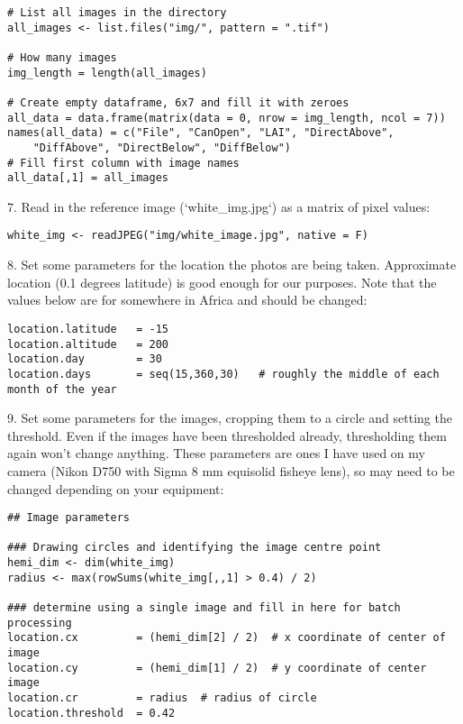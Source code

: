 \documentclass{article}
\begin{document}
\begin{lstlisting}
# List all images in the directory
all_images <- list.files("img/", pattern = ".tif")

# How many images
img_length = length(all_images)

# Create empty dataframe, 6x7 and fill it with zeroes
all_data = data.frame(matrix(data = 0, nrow = img_length, ncol = 7))
names(all_data) = c("File", "CanOpen", "LAI", "DirectAbove", 
	"DiffAbove", "DirectBelow", "DiffBelow")
# Fill first column with image names
all_data[,1] = all_images
\end{lstlisting}

7. Read in the reference image (`white\_img.jpg`) as a matrix of pixel values:

\begin{lstlisting}
white_img <- readJPEG("img/white_image.jpg", native = F)
\end{lstlisting}

8. Set some parameters for the location the photos are being taken. Approximate location (0.1 degrees latitude) is good enough for our purposes. Note that the values below are for somewhere in Africa and should be changed:

\begin{lstlisting}
location.latitude   = -15
location.altitude   = 200
location.day        = 30
location.days       = seq(15,360,30)   # roughly the middle of each month of the year 
\end{lstlisting}

9. Set some parameters for the images, cropping them to a circle and setting the threshold. Even if the images have been thresholded already, thresholding them again won't change anything. These parameters are ones I have used on my camera (Nikon D750 with Sigma 8 mm equisolid fisheye lens), so may need to be changed depending on your equipment:

\begin{lstlisting}
## Image parameters

### Drawing circles and identifying the image centre point
hemi_dim <- dim(white_img)
radius <- max(rowSums(white_img[,,1] > 0.4) / 2)

### determine using a single image and fill in here for batch processing
location.cx         = (hemi_dim[2] / 2)  # x coordinate of center of image
location.cy         = (hemi_dim[1] / 2)  # y coordinate of center image
location.cr         = radius  # radius of circle
location.threshold  = 0.42
\end{lstlisting}
\end{document}
